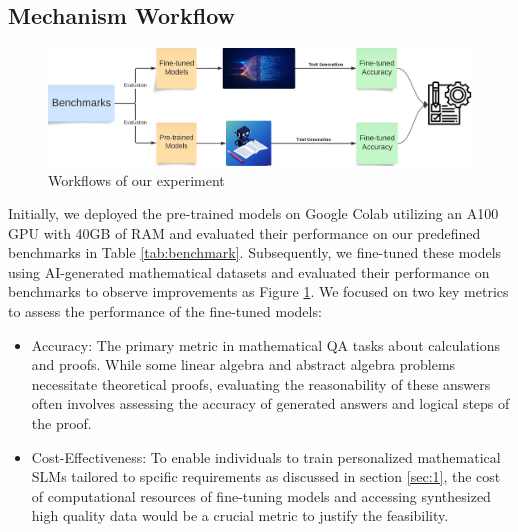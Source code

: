 \documentclass[10pt]{article}
\begin{document}
\subsection{Mechanism Workflow}
\begin{figure}[h]
    \centering
    \includegraphics[width=\linewidth]{Figures/Workflow.png}
    \caption{Workflows of our experiment}
    \label{fig:Workflow}
\end{figure}
 
Initially, we deployed the pre-trained models on Google Colab utilizing an A100 GPU with 40GB of RAM and evaluated their performance on our predefined benchmarks in Table \ref{tab:benchmark}. Subsequently, we fine-tuned these models using AI-generated mathematical datasets and evaluated their performance on benchmarks to observe improvements as Figure \ref{fig:Workflow}. We focused on two key metrics to assess the performance of the fine-tuned models:
\begin{itemize}
    \item Accuracy: The primary metric in mathematical QA tasks about calculations and proofs. While some linear algebra and abstract algebra problems necessitate theoretical proofs, evaluating the reasonability of these answers often involves assessing the accuracy of generated answers and logical steps of the proof. 
    \item Cost-Effectiveness: To enable individuals to train personalized mathematical SLMs tailored to spcific requirements as discussed in  section \ref{sec:1}, the cost of computational resources of fine-tuning models and accessing synthesized high quality data would be a crucial metric to justify the feasibility. 
    
\end{itemize}
\end{document}
